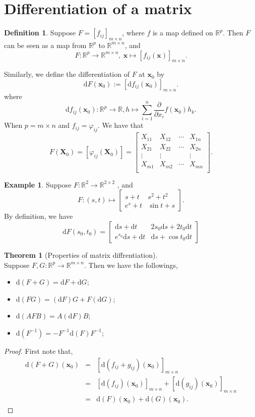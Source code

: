\documentclass[12pt]{article}
\theoremstyle{definition}
\newtheorem{definition}{Definition}[section]
\newtheorem{example}{Example}[section]
\newtheorem{theorem}{Theorem}[section]
\newcommand{\x}{\mathbf{x}}
\newcommand{\R}{\mathbb{R}}
\newcommand{\X}{\mathbf{X}}
\newcommand{\D}{\mathrm{d}}
\newcommand{\pd}[1]{\frac{\partial}{\partial #1}}
\begin{document}
\section{Differentiation of a matrix}
\begin{definition}
Suppose	$F = [f_{ij}]_{m\times n}$, where $f$ is a map defined on $\R^p$. Then $F$ can  be seen as a map from $\R^p$ to $\R^{m\times n}$, and 
$$
F: \R^p \to \R^{m \times n},\ \x \mapsto [f_{ij}(\x)]_{m \times n}.
$$
\end{definition}
Similarly, we define the differentiation of $F$ at $\x_0$ by 
$$
\D F(\x_0):= [\D f_{ij}(\x_0)]_{m \times n}.
$$
where 
$$
\D f_{ij}(\x_0): \R^p \to \R, h \mapsto \sum_{i=1}^{n}\pd{x_i}f(\x_0)h_k.
$$
When $p = m \times n$ and $f_{ij}=\varphi_{ij}$. We have that 
$$
F(\X_0) = [\varphi_{ij}(\X_0)]=\begin{bmatrix}
	X_{11} & X_{12} & \cdots & X_{1n} \\ 
	X_{21} & X_{22} & \cdots & X_{2n} \\ 
	\vdots & \vdots &   & \vdots \\ 
	X_{m1} & X_{m2} & \cdots & X_{mn} \\ 
\end{bmatrix}.
$$

\begin{example}
Suppose $F:\R^2 \to \R^{2 \times 2}$	, and 
$$
F: (s,t) \mapsto \begin{bmatrix}
	s+t & s^2+t^2 \\
	e^s+t & \sin t +s 
\end{bmatrix}.
$$
By definition, we have 
$$
\D F(s_0,t_0) =\begin{bmatrix}
	\D s + \D t & 2s_0 \D s + 2t_0 \D t \\
	e^{s_0} \D s + \D t & \D s + \cos t_0 \D t
\end{bmatrix} 
$$
\end{example}

\begin{theorem}[Properties of matrix diffrentiation] \ \\
Suppose $F,G: \R^p \to \R^{ m\times n}$.
Then we have the followings,
\begin{itemize}
	\item $\D(F+G) = \D F + \D G$;
	\item $\D (FG) = (\D F)G+ F (\D G)$;
	\item $\D (AFB) = A (\D F)B$;
	\item $\D (F^{-1}) = - F^{-1}\D(F)F^{-1}$; 
\end{itemize}
\begin{proof}
First note that,
\begin{eqnarray*}
	\D(F+G)(\x_0) &=& [\D(f_{ij}+g_{ij})(\x_0)]_{m \times n} \\
	&=& [\D(f_{ij})(\x_0)]_{m \times n} + [\D(g_{ij})(\x_0)]_{m \times n} \\
	&=& \D(F)(\x_0)+\D(G)(\x_0).
\end{eqnarray*}
\end{proof}
\end{theorem}
\end{document}

